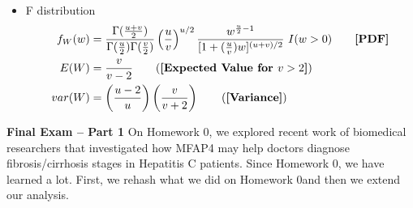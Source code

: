 \documentclass{article}
\begin{document}
\begin{multicols}{2}
\begin{itemize}
\begin{align*}
  \end{align*}
  \item F distribution
  \begin{align*}
    f_W(w)&=\frac{\Gamma(\frac{u+v}{2})}{\Gamma(\frac{u}{2})\Gamma(\frac{v}{2})}
\left(\frac{u}{v}\right)^{u/2}\frac{w^{\frac{u}{2}-1}}{[1+(\frac{u}{v})w]^{(u+v)/2}}~I(w>0) \tag*{\textbf{[PDF]}}\\
    E(W)&=\frac{v}{v-2} \tag{\textbf{[Expected Value for $v>2$]}}\\
    var(W)&=\left(\frac{u-2}{u}\right) \left(\frac{v}{v+2}\right) \tag{\textbf{[Variance]}}\\
  \end{align*}
  \end{itemize}
  \end{multicols}
\newpage
\noindent \textbf{Final Exam -- Part 1} On Homework 0, we explored recent work of biomedical researchers that
investigated how MFAP4 may help doctors diagnose fibrosis/cirrhosis
stages in Hepatitis C patients. Since Homework 0, we have learned a lot. First, we 
rehash what we did on Homework 0and then we extend our analysis.
\end{document}
